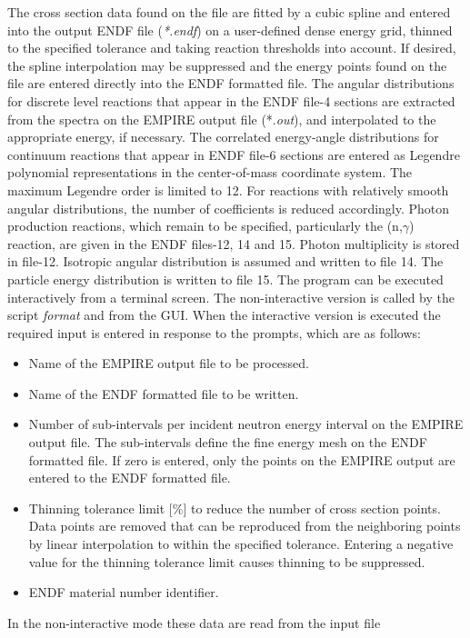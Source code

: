\documentclass[twocolumn,amsmath,amssymb,10pt,groupedaddress,a4paper]{revtex4}
\begin{document}
The cross section data found on the file are fitted by a cubic spline
and entered into the output ENDF file (\emph{{*}.endf}) on a user-defined
dense energy grid, thinned to the specified tolerance and taking reaction
thresholds into account. If desired, the spline interpolation may
be suppressed and the energy points found on the file are entered
directly into the ENDF formatted file.
The angular distributions for discrete level reactions that appear
in the ENDF file-4 sections are extracted from the spectra on the
EMPIRE output file ({*}.\emph{out}), and interpolated to the appropriate
energy, if necessary.
The correlated energy-angle distributions for continuum reactions
that appear in ENDF file-6 sections are entered as Legendre polynomial
representations in the center-of-mass coordinate system. The maximum
Legendre order is limited to 12. For reactions with relatively smooth
angular distributions, the number of coefficients is reduced accordingly.
Photon production reactions, which remain to be specified, particularly
the (n,$\gamma$) reaction, are given in the ENDF files-12, 14 and
15. Photon multiplicity is stored in file-12. Isotropic angular distribution
is assumed and written to file 14. The particle energy distribution
is written to file 15.
The program can be executed interactively from a terminal screen.
The non-interactive version is called by the script \emph{format}
and from the GUI. When the interactive version is executed the required
input is entered in response to the prompts, which are as follows:
\begin{itemize}
\item Name of the EMPIRE output file to be processed.
\item Name of the ENDF formatted file to be written.
\item Number of sub-intervals per incident neutron energy interval on the
EMPIRE output file. The sub-intervals define the fine energy mesh
on the ENDF formatted file. If zero is entered, only the points on
the EMPIRE output are entered to the ENDF formatted file.
\item Thinning tolerance limit {[}\%{]} to reduce the number of cross section
points. Data points are removed that can be reproduced from the neighboring
points by linear interpolation to within the specified tolerance.
Entering a negative value for the thinning tolerance limit causes
thinning to be suppressed.
\item ENDF material number identifier.
\end{itemize}
In the non-interactive mode these data are read from the input file
\end{document}
